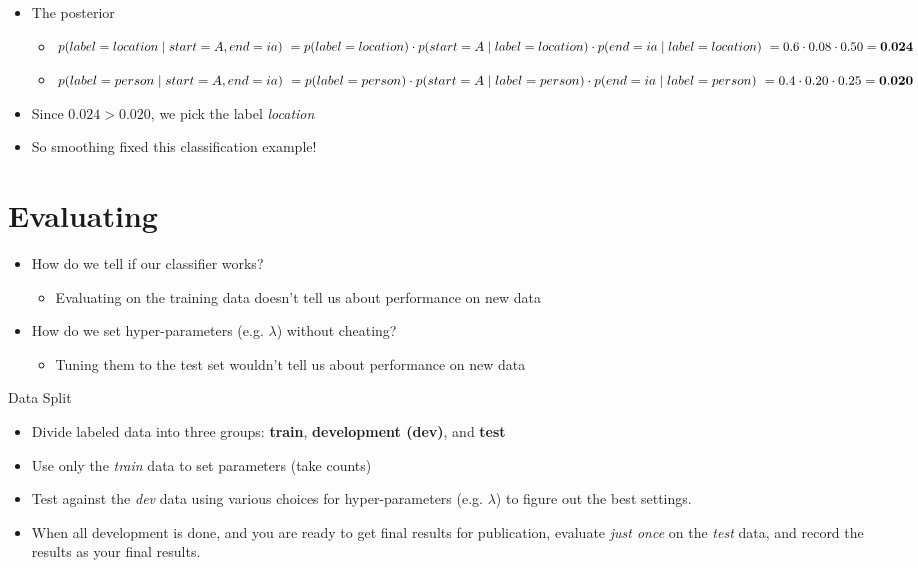 \documentclass[11pt,letterpaper]{article}
\begin{document}
\begin{itemize}
\begin{itemize}
    \end{itemize}


  \item The posterior
    \begin{itemize}
      \item $p(label=location \mid start=A, end=ia) \\
            ~ = p(label=location) \cdot p(start=A \mid label=location) \cdot p(end=ia \mid label=location) \\
            ~ = 0.6 \cdot 0.08 \cdot 0.50 = \mathbf{0.024}$
      \item $p(label=person \mid start=A, end=ia) \\
            ~ = p(label=person) \cdot p(start=A \mid label=person) \cdot p(end=ia \mid label=person) \\
            ~ = 0.4 \cdot 0.20 \cdot 0.25 = \mathbf{0.020}$
    \end{itemize}
  \item Since $0.024 > 0.020$, we pick the label \textit{location}
  \item So smoothing fixed this classification example!
\end{itemize}




\section{Evaluating}

\begin{itemize}
  \item How do we tell if our classifier works?
    \begin{itemize}
      \item Evaluating on the training data doesn't tell us about performance on new data
    \end{itemize}
  \item How do we set hyper-parameters (e.g. $\lambda$) without cheating?
    \begin{itemize}
      \item Tuning them to the test set wouldn't tell us about performance on new data
    \end{itemize}
\end{itemize}


Data Split

\begin{itemize}
  \item Divide labeled data into three groups: \textbf{train}, \textbf{development (dev)}, and \textbf{test}
  \item Use only the \textit{train} data to set parameters (take counts)
  \item Test against the \textit{dev} data using various choices for hyper-parameters (e.g. $\lambda$) to figure out the best settings.
  \item When all development is done, and you are ready to get final results for publication, evaluate \textit{just once} on the \textit{test} data, and record the results as your final results.
\end{itemize}
\end{document}
